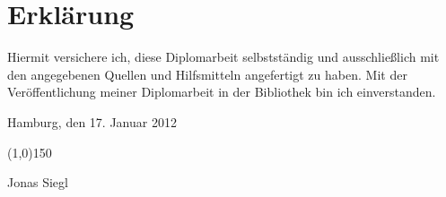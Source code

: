 \makeatletter\@openrightfalse
\chapter*{Erkl\"arung}
Hiermit versichere ich, diese Diplomarbeit selbstst\"andig und ausschlie\ss lich mit den angegebenen Quellen und Hilfsmitteln angefertigt zu haben. Mit der Ver\"offentlichung meiner Diplomarbeit in der Bibliothek bin ich einverstanden.\par
\vspace{3em}
\noindent Hamburg, den 17. Januar 2012\par
\vspace{6em}
\noindent \line(1,0){150}\par
\noindent Jonas Siegl
\@openrighttrue\makeatother

